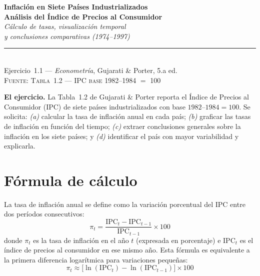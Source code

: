 \documentclass[12pt, letterpaper]{article}
\theoremstyle{remark}
\begin{document}
\begin{center}
  {\LARGE\bfseries Inflaci\'on en Siete Pa\'ises Industrializados}\\[6pt]
  {\LARGE\bfseries An\'alisis del \'Indice de Precios al Consumidor}\\[12pt]
  {\large\itshape C\'alculo de tasas, visualizaci\'on temporal}\\
  {\large\itshape y conclusiones comparativas (1974--1997)}\\[14pt]
  \rule{0.55\linewidth}{0.6pt}\\[8pt]
  {\normalsize Ejercicio~1.1 --- \textit{Econometr\'ia}, Gujarati \& Porter, 5.a ed.}\\[4pt]
  {\small\textsc{Fuente: Tabla~1.2 --- IPC base 1982--1984 $=$ 100}}
\end{center}

\vspace{10pt}

\noindent\textbf{El ejercicio.}\quad
La Tabla~1.2 de Gujarati \& Porter reporta el \'Indice de Precios al Consumidor
(IPC) de siete pa\'ises industrializados con base $1982\text{--}1984 = 100$.
Se solicita: \emph{(a)} calcular la tasa de inflaci\'on anual en cada pa\'is;
\emph{(b)} graficar las tasas de inflaci\'on en funci\'on del tiempo;
\emph{(c)} extraer conclusiones generales sobre la inflaci\'on en los siete pa\'ises;
y \emph{(d)} identificar el pa\'is con mayor variabilidad y explicarla.

\section{F\'ormula de c\'alculo}

La tasa de inflaci\'on anual se define como la variaci\'on porcentual del IPC
entre dos per\'iodos consecutivos:
\begin{equation}
  \pi_t
    = \frac{\text{IPC}_t - \text{IPC}_{t-1}}{\text{IPC}_{t-1}} \times 100
  \label{eq:inflacion}
\end{equation}
donde $\pi_t$ es la tasa de inflaci\'on en el a\~no $t$ (expresada en porcentaje)
e $\text{IPC}_t$ es el \'indice de precios al consumidor en ese mismo a\~no.
Esta f\'ormula es equivalente a la primera diferencia logar\'itmica para
variaciones peque\~nas:
\begin{equation}
  \pi_t \approx \bigl[\ln(\text{IPC}_t) - \ln(\text{IPC}_{t-1})\bigr]\times 100
  \label{eq:logdiff}
\end{equation}
\end{document}
